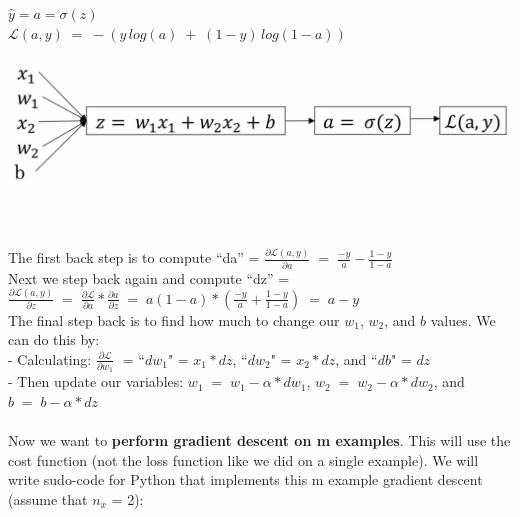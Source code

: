 \documentclass[11pt, a4paper]{article}
\begin{document}
\begin{spacing}{1.1}
\begin{minipage}[c]{8cm}
	$\hat{y} = a = \sigma(z)$ \\
	$\mathcal{L}(a,y) \; = \; -(y\,log(a) \; + \; (1-y)\,log(1-a))$ \\
	\end{minipage}
	\begin{minipage}[c]{6cm}
	\vspace*{2mm}
	\includegraphics[scale=.2]{comp_graph}
	\end{minipage} \vspace*{1mm} \\~\\
	The first back step is to compute ``da'' = $\frac{\partial \mathcal{L}(a,y)}{\partial a}\; = \; \frac{-y}{a} - \frac{1-y}{1-a}$ \vspace*{2mm}\\
	Next we step back again and compute ``dz'' = $\frac{\partial \mathcal{L}(a,y)}{\partial z}\; = \; \frac{\partial \mathcal{L}}{\partial a}*\frac{\partial a}{\partial z}\; = \; a(1-a)*(\frac{-y}{a} + \frac{1-y}{1-a})\; = \; a-y$ \vspace*{2mm}\\
	The final step back is to find how much to change our $w_1$, $w_2$, and $b$ values. We can do this by: \vspace*{1mm} \\
	\hspace*{2mm} - Calculating: $\frac{\partial \mathcal{L}}{\partial w_1}\;$ = ``$dw_1$" = $x_1 * dz$, ``$dw_2$" = $x_2 * dz$, and ``$db$" = $dz$ \vspace*{1mm} \\
	\hspace*{2mm} - Then update our variables: $w_1 \; = \; w_1 - \alpha* dw_1$, $w_2 \; = \; w_2 - \alpha* dw_2$, and $b \; = \; b - \alpha* dz$ \\~\\
	Now we want to \textbf{perform gradient descent on m examples}. This will use the cost function (not the loss function like we did on a single example). We will write sudo-code for Python that implements this m example gradient descent (assume that $n_x$ = 2): \\
	\begin{minipage}[c]{8cm}

\end{minipage}
\end{spacing}
\end{document}
